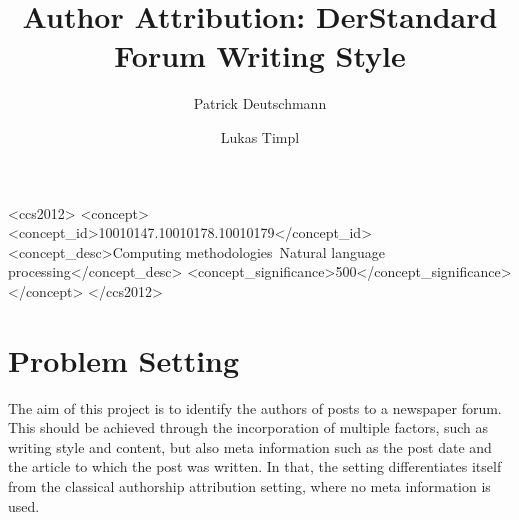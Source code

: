 \documentclass[acmsmall]{acmart}
\begin{document}
\title{Author Attribution: DerStandard Forum Writing Style}

\author{Patrick Deutschmann}

\author{Lukas Timpl}


\begin{abstract}
\end{abstract}

\begin{CCSXML}
<ccs2012>
   <concept>
       <concept_id>10010147.10010178.10010179</concept_id>
       <concept_desc>Computing methodologies~Natural language processing</concept_desc>
       <concept_significance>500</concept_significance>
       </concept>
 </ccs2012>
\end{CCSXML}



\maketitle

\section{Problem Setting}

The aim of this project is to identify the authors of posts to a newspaper forum. This should be achieved through the incorporation of multiple factors, such as writing style and content, but also meta information such as the post date and the article to which the post was written. In that, the setting differentiates itself from the classical authorship attribution setting, where no meta information is used. 
\end{document}
